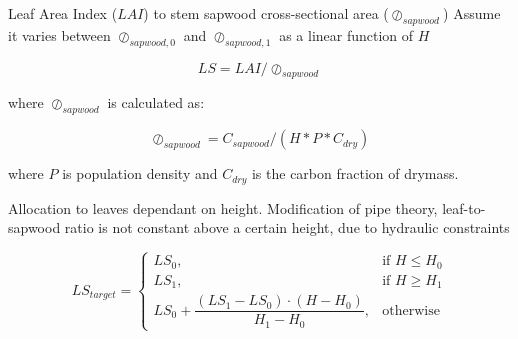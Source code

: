 Leaf Area Index ($LAI$) to stem sapwood cross-sectional area ($\oslash_{sapwood}$)
Assume it varies between $\oslash_{sapwood,0}$ and $\oslash_{sapwood,1}$ as a linear function of $H$ 

\begin{equation}
	LS = LAI / \oslash_{sapwood}
\end{equation}

where $\oslash_{sapwood}$ is calculated as:

\begin{equation}
	\oslash_{sapwood} = C_{sapwood}/(H * P *C_{dry} )
\end{equation}

where $P$ is population density and $C_{dry}$ is the carbon fraction of drymass.

Allocation to leaves dependant on height. Modification of pipe theory, leaf-to-sapwood ratio is not constant above a certain  height, due to hydraulic constraints \citep{Magnani2000,Deckmun2006}

\begin{equation}
	LS_{target}=
	\begin{cases}
		    LS_{0},& \text{if } H\le H_{0} \\ 
		    LS_{1},& \text{if } H\ge H_{1} \\
		    LS_{0} + \dfrac{(LS_{1}-LS_{0})\cdot (H-H_{0})}{H_{1}-H_{0}},& \text{otherwise}
		\end{cases}
\end{equation}
